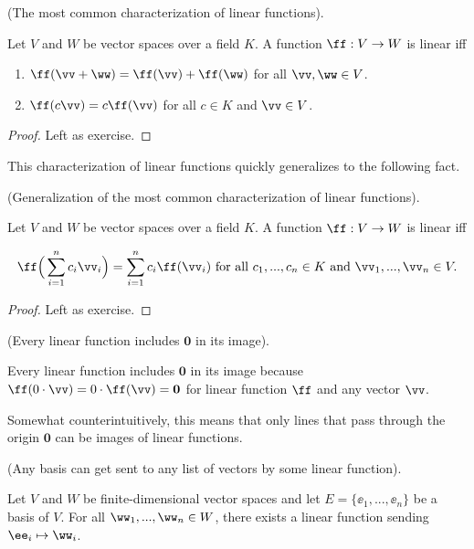 \begin{theorem}
    (The most common characterization of linear functions).
    
    Let $V$ and $W$ be vector spaces over a field $K$. A function $\ff:V \rightarrow W$ is linear iff
    
    \begin{enumerate}
        \item $\ff(\vv + \ww) = \ff(\vv) + \ff(\ww)$ for all $\vv, \ww \in V$.
        \item $\ff(c\vv) = c\ff(\vv)$ for all $c \in K$ and $\vv \in V$.
    \end{enumerate}
\end{theorem}

\begin{proof}
   Left as exercise.
\end{proof}

This characterization of linear functions quickly generalizes to the following fact.

\begin{theorem}
    (Generalization of the most common characterization of linear functions).
    
    Let $V$ and $W$ be vector spaces over a field $K$. A function $\ff:V \rightarrow W$ is linear iff
    
    \begin{align*}
        \ff \Big(\sum_{i = 1}^n c_i \vv_i \Big) = \sum_{i = 1}^n c_i \ff(\vv_i) \text{ for all } c_1, ..., c_n \in K \text{ and } \vv_1, ..., \vv_n \in V.
    \end{align*}
\end{theorem}

\begin{proof}
    Left as exercise.
\end{proof}

\begin{theorem}
    \label{ch::lin_alg::thm::linear_functions_have_zero_in_image}
    (Every linear function includes $\mathbf{0}$ in its image).
    
    Every linear function includes $\mathbf{0}$ in its image because $\ff(0 \cdot \vv) = 0 \cdot \ff(\vv) = \mathbf{0}$ for linear function $\ff$ and any vector $\vv$.
    
    Somewhat counterintuitively, this means that only lines that pass through the origin $\mathbf{0}$ can be images of linear functions.
\end{theorem}

\begin{theorem}
\label{ch::lin_alg::thm::basis_sent_to_any_ordered_list}
    (Any basis can get sent to any list of vectors by some linear function).
    
    Let $V$ and $W$ be finite-dimensional vector spaces and let $E = \{\ee_1, ..., \ee_n\}$ be a basis of $V$. For all $\ww_1, ..., \ww_n \in W$, there exists a linear function sending $\ee_i \mapsto \ww_i$.
\end{theorem}

